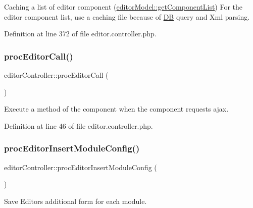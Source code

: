 Caching a list of editor component (\hyperlink{classeditorModel_a24cf5d2f9bc9783dd2efd85fb0f89408}{editor\+Model\+::get\+Component\+List}) For the editor component list, use a caching file because of \hyperlink{classDB}{DB} query and Xml parsing. 



Definition at line 372 of file editor.\+controller.\+php.

\mbox{\label{classeditorController_ab7eab43a1ba21645dabcf36f32b27289}} 
\subsubsection{\texorpdfstring{proc\+Editor\+Call()}{procEditorCall()}}
{\footnotesize\ttfamily editor\+Controller\+::proc\+Editor\+Call (\begin{DoxyParamCaption}{ }\end{DoxyParamCaption})}



Execute a method of the component when the component requests ajax. 



Definition at line 46 of file editor.\+controller.\+php.

\mbox{\label{classeditorController_af20e397838bd94b60b09b0cba2d7da0d}} 
\subsubsection{\texorpdfstring{proc\+Editor\+Insert\+Module\+Config()}{procEditorInsertModuleConfig()}}
{\footnotesize\ttfamily editor\+Controller\+::proc\+Editor\+Insert\+Module\+Config (\begin{DoxyParamCaption}{ }\end{DoxyParamCaption})}



Save Editor\textquotesingle{}s additional form for each module. 



